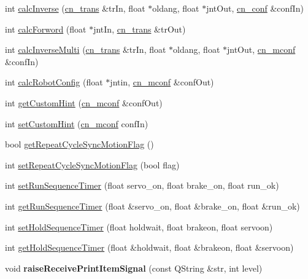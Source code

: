 \begin{DoxyCompactItemize}
\item 
int \hyperlink{classCUIApp_abc79a03d99e50c46db7fc493698d617d}{calc\-Inverse} (\hyperlink{structcn__trans}{cn\-\_\-trans} \&tr\-In, float $\ast$oldang, float $\ast$jnt\-Out, \hyperlink{structcn__conf}{cn\-\_\-conf} \&conf\-In)
\item 
int \hyperlink{classCUIApp_ad2f3db1ea13dd4e2e37f79f1bfa60bd3}{calc\-Forword} (float $\ast$jnt\-In, \hyperlink{structcn__trans}{cn\-\_\-trans} \&tr\-Out)
\item 
int \hyperlink{classCUIApp_ac89740ce50183b138feb82cda70013dd}{calc\-Inverse\-Multi} (\hyperlink{structcn__trans}{cn\-\_\-trans} \&tr\-In, float $\ast$oldang, float $\ast$jnt\-Out, \hyperlink{structcn__mconf}{cn\-\_\-mconf} \&conf\-In)
\item 
int \hyperlink{classCUIApp_a8fe9e841289333c8c7de44a4d34de14e}{calc\-Robot\-Config} (float $\ast$jntin, \hyperlink{structcn__mconf}{cn\-\_\-mconf} \&conf\-Out)
\item 
int \hyperlink{classCUIApp_aff78bb6100cbdc68b410b5f2199d63a8}{get\-Custom\-Hint} (\hyperlink{structcn__mconf}{cn\-\_\-mconf} \&conf\-Out)
\item 
int \hyperlink{classCUIApp_a8dca5ed8ffafdeb5f052e6cbb2adfa57}{set\-Custom\-Hint} (\hyperlink{structcn__mconf}{cn\-\_\-mconf} conf\-In)
\item 
bool \hyperlink{classCUIApp_a5e01da316ce0b59ae5780ef55c1fb9af}{get\-Repeat\-Cycle\-Sync\-Motion\-Flag} ()
\item 
int \hyperlink{classCUIApp_a677a189567521410686a0f302fcb88a2}{set\-Repeat\-Cycle\-Sync\-Motion\-Flag} (bool flag)
\item 
int \hyperlink{classCUIApp_a00d24384842a8f89965038629122628d}{set\-Run\-Sequence\-Timer} (float servo\-\_\-on, float brake\-\_\-on, float run\-\_\-ok)
\item 
int \hyperlink{classCUIApp_a66980bb62ac3fee3ce2eda42cdf632b9}{get\-Run\-Sequence\-Timer} (float \&servo\-\_\-on, float \&brake\-\_\-on, float \&run\-\_\-ok)
\item 
int \hyperlink{classCUIApp_a37a2b01ffa203afe9601e81a4e3032d1}{set\-Hold\-Sequence\-Timer} (float holdwait, float brakeon, float servoon)
\item 
int \hyperlink{classCUIApp_acf7ab64981a484987496543ade24c494}{get\-Hold\-Sequence\-Timer} (float \&holdwait, float \&brakeon, float \&servoon)
\item 
\hypertarget{classCUIApp_aa7d6a48216718947d460c53ef50e20d3}{void {\bfseries raise\-Receive\-Print\-Item\-Signal} (const Q\-String \&str, int level)}\label{classCUIApp_aa7d6a48216718947d460c53ef50e20d3}


\end{DoxyCompactItemize}
